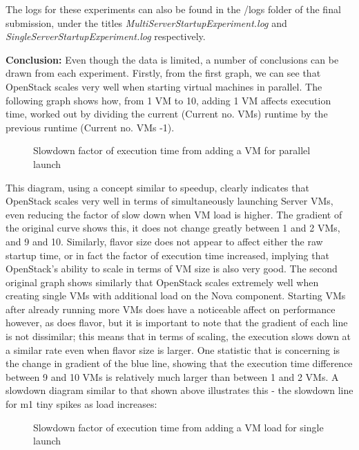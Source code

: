 The logs for these experiments can also be found in the /logs folder of the final submission, under the titles \textit{MultiServerStartupExperiment.log} and \textit{SingleServerStartupExperiment.log} respectively.

\textbf{Conclusion:}
Even though the data is limited, a number of conclusions can be drawn from each experiment. 
Firstly, from the first graph, we can see that OpenStack scales very well when starting virtual machines in parallel. The following graph shows how, from 1 VM to 10, adding 1 VM affects execution time, worked out by dividing the current (Current no. VMs) runtime by the previous runtime (Current no. VMs -1).  

\begin{figure}[H]
\centering
{}
\caption{Slowdown factor of execution time from adding a VM for parallel launch}
\end{figure}

This diagram, using a concept similar to speedup\cite{speedup}, clearly indicates that OpenStack scales very well in terms of simultaneously launching Server VMs, even reducing the factor of slow down when VM load is higher. The gradient of the original curve shows this, it does not change greatly between 1 and 2 VMs, and 9 and 10. Similarly, flavor size does not appear to affect either the raw startup time, or in fact the factor of execution time increased, implying that OpenStack's ability to scale in terms of VM size is also very good. 
The second original graph shows similarly that OpenStack scales extremely well when creating single VMs with additional load on the Nova component. Starting VMs after already running more VMs does have a noticeable affect on performance however, as does flavor, but it is important to note that the gradient of each line is not dissimilar; this means that in terms of scaling, the execution slows down at a similar rate even when flavor size is larger. One statistic that is concerning is the change in gradient of the blue line, showing that the execution time difference between 9 and 10 VMs is relatively much larger than between 1 and 2 VMs. A slowdown diagram similar to that shown above illustrates this - the slowdown line for m1 tiny spikes as load increases:

\begin{figure}[H]
\centering
{}
\caption{Slowdown factor of execution time from adding a VM load for single launch}
\end{figure}

